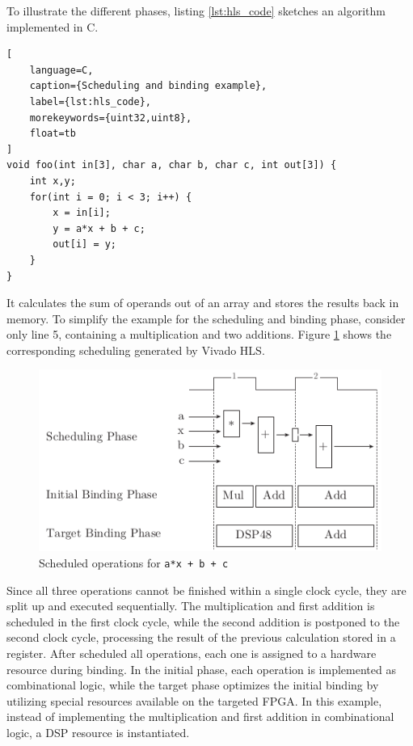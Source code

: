 To illustrate the different phases, listing \ref{lst:hls_code} sketches an
algorithm implemented in C. 
\begin{lstlisting}[
	language=C,
	caption={Scheduling and binding example},
	label={lst:hls_code},
	morekeywords={uint32,uint8},
	float=tb
]
void foo(int in[3], char a, char b, char c, int out[3]) {
	int x,y;
	for(int i = 0; i < 3; i++) {
		x = in[i];
		y = a*x + b + c;
		out[i] = y;
	}
}
\end{lstlisting}
It calculates the sum of operands out of an array and stores the results back
in memory. To simplify the example for the scheduling and binding phase,
consider only line 5, containing a multiplication and two additions. Figure
\ref{fig:hls_sb} shows the corresponding scheduling generated by Vivado
\ac{HLS}.
\begin{figure}[tb]
	\centering
	\includegraphics{../figures/hls_sb}
	\caption{Scheduled operations for \lstinline{a*x + b + c}}
	\label{fig:hls_sb}
\end{figure}
Since all three operations cannot be finished within a single clock cycle,
they are split up and executed sequentially. The multiplication and first
addition is scheduled in the first clock cycle, while the second addition is
postponed to the second clock cycle, processing the result of the previous
calculation stored in a register. After scheduled all operations, each one is
assigned to a hardware resource during binding. In the initial phase, each
operation is implemented as combinational logic, while the target phase
optimizes the initial binding by utilizing special resources available on the
targeted \ac{FPGA}. In this example, instead of implementing the
multiplication and first addition in combinational logic, a \ac{DSP} resource
is instantiated.

